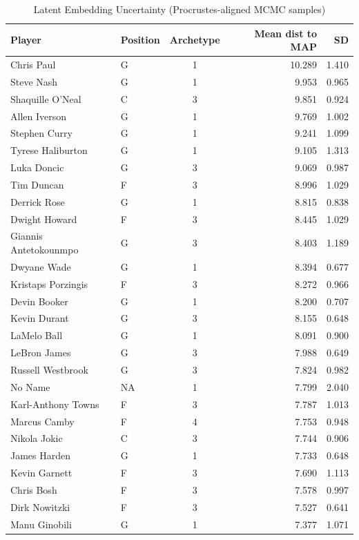 \begin{table}[t]
\caption*{
{\fontsize{20}{25}\selectfont  Latent Embedding Uncertainty (Procrustes-aligned MCMC samples)\fontsize{12}{15}\selectfont }
} 
\fontsize{12.0pt}{14.0pt}\selectfont
\begin{tabular*}{\linewidth}{@{\extracolsep{\fill}}llcrr}
\toprule
Player & Position & Archetype & Mean dist to MAP & SD \\ 
\midrule\addlinespace[2.5pt]
Chris Paul & G & 1 & 10.289 & 1.410 \\ 
Steve Nash & G & 1 & 9.953 & 0.965 \\ 
Shaquille O'Neal & C & 3 & 9.851 & 0.924 \\ 
Allen Iverson & G & 1 & 9.769 & 1.002 \\ 
Stephen Curry & G & 1 & 9.241 & 1.099 \\ 
Tyrese Haliburton & G & 1 & 9.105 & 1.313 \\ 
Luka Doncic & G & 3 & 9.069 & 0.987 \\ 
Tim Duncan & F & 3 & 8.996 & 1.029 \\ 
Derrick Rose & G & 1 & 8.815 & 0.838 \\ 
Dwight Howard & F & 3 & 8.445 & 1.029 \\ 
Giannis Antetokounmpo & G & 3 & 8.403 & 1.189 \\ 
Dwyane Wade & G & 1 & 8.394 & 0.677 \\ 
Kristaps Porzingis & F & 3 & 8.272 & 0.966 \\ 
Devin Booker & G & 1 & 8.200 & 0.707 \\ 
Kevin Durant & G & 3 & 8.155 & 0.648 \\ 
LaMelo Ball & G & 1 & 8.091 & 0.900 \\ 
LeBron James & G & 3 & 7.988 & 0.649 \\ 
Russell Westbrook & G & 3 & 7.824 & 0.982 \\ 
No Name & NA & 1 & 7.799 & 2.040 \\ 
Karl-Anthony Towns & F & 3 & 7.787 & 1.013 \\ 
Marcus Camby & F & 4 & 7.753 & 0.948 \\ 
Nikola Jokic & C & 3 & 7.744 & 0.906 \\ 
James Harden & G & 1 & 7.733 & 0.648 \\ 
Kevin Garnett & F & 3 & 7.690 & 1.113 \\ 
Chris Bosh & F & 3 & 7.578 & 0.997 \\ 
Dirk Nowitzki & F & 3 & 7.527 & 0.641 \\ 
Manu Ginobili & G & 1 & 7.377 & 1.071 \\ 

\end{tabular*}
\end{table}
